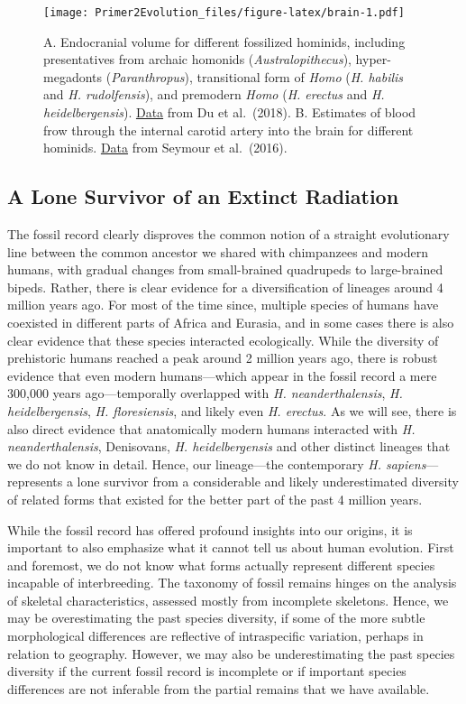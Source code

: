 \documentclass[
]{book}
\begin{document}
\begin{figure}
\centering
\texttt{[image: Primer2Evolution\_files/figure-latex/brain-1.pdf]}
\caption{\label{fig:brain}A. Endocranial volume for different fossilized hominids, including presentatives from archaic homonids (\emph{Australopithecus}), hyper-megadonts (\emph{Paranthropus}), transitional form of \emph{Homo} (\emph{H. habilis} and \emph{H. rudolfensis}), and premodern \emph{Homo} (\emph{H. erectus} and \emph{H. heidelbergensis}). \href{data/14_human_brain.csv}{Data} from Du et al.~(2018). B. Estimates of blood frow through the internal carotid artery into the brain for different hominids. \href{data/14_human_brain.csv}{Data} from Seymour et al.~(2016).}
\end{figure}

\hypertarget{a-lone-survivor-of-an-extinct-radiation}{%
\subsection{A Lone Survivor of an Extinct Radiation}\label{a-lone-survivor-of-an-extinct-radiation}}

The fossil record clearly disproves the common notion of a straight evolutionary line between the common ancestor we shared with chimpanzees and modern humans, with gradual changes from small-brained quadrupeds to large-brained bipeds. Rather, there is clear evidence for a diversification of lineages around 4 million years ago. For most of the time since, multiple species of humans have coexisted in different parts of Africa and Eurasia, and in some cases there is also clear evidence that these species interacted ecologically. While the diversity of prehistoric humans reached a peak around 2 million years ago, there is robust evidence that even modern humans---which appear in the fossil record a mere 300,000 years ago---temporally overlapped with \emph{H. neanderthalensis}, \emph{H. heidelbergensis}, \emph{H. floresiensis}, and likely even \emph{H. erectus}. As we will see, there is also direct evidence that anatomically modern humans interacted with \emph{H. neanderthalensis}, Denisovans, \emph{H. heidelbergensis} and other distinct lineages that we do not know in detail. Hence, our lineage---the contemporary \emph{H. sapiens}---represents a lone survivor from a considerable and likely underestimated diversity of related forms that existed for the better part of the past 4 million years.

While the fossil record has offered profound insights into our origins, it is important to also emphasize what it cannot tell us about human evolution. First and foremost, we do not know what forms actually represent different species incapable of interbreeding. The taxonomy of fossil remains hinges on the analysis of skeletal characteristics, assessed mostly from incomplete skeletons. Hence, we may be overestimating the past species diversity, if some of the more subtle morphological differences are reflective of intraspecific variation, perhaps in relation to geography. However, we may also be underestimating the past species diversity if the current fossil record is incomplete or if important species differences are not inferable from the partial remains that we have available.
\end{document}
